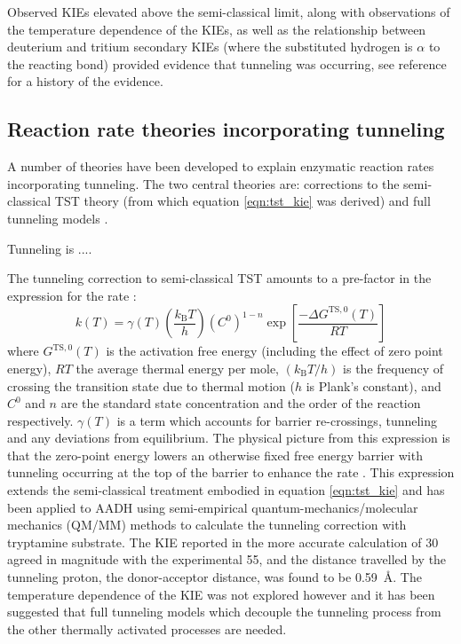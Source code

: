 Observed KIEs elevated above the semi-classical limit, along with observations of the temperature dependence of the KIEs, as well as the relationship between deuterium and tritium secondary KIEs (where the substituted hydrogen is $\alpha$ to the reacting bond) provided evidence that tunneling was occurring, see reference \cite{klinmanbeyond2009} for a history of the evidence. 

\subsection{Reaction rate theories incorporating tunneling}

A number of theories have been developed to explain enzymatic reaction rates incorporating tunneling. The two central theories are: corrections to the semi-classical TST theory (from which equation \ref{eqn:tst_kie} was derived) \cite{bellTunnelEffectChemistry1980} and full tunneling models \cite{kuznetsovProtonHydrogenAtom1999a,  antoniouLargeKineticIsotope1997, antoniouInternalEnzymeMotions2001, knappTemperatureDependentIsotopeEffects2002}. 

Tunneling is ....

The tunneling correction to semi-classical TST amounts to a pre-factor in the expression for the rate \cite{garciavilocaHowEnzymesWork2004}: 
\begin{equation}\label{eqn:tst}
k(T) =\gamma(T)\left(\frac{k_{\mathrm{B}} T}{h}\right)\left(C^{0}\right)^{1-n}\exp \left[\frac{-\Delta G^{\mathrm{TS}, 0}(T)}{R T}\right]
\end{equation}
where $G^{\mathrm{TS}, 0}(T)$ is the activation free energy (including the effect of zero point energy), $RT$ the average thermal energy per mole, $\left(k_{\mathrm{B}} T / h\right)$ is the frequency of crossing the transition state due to thermal motion ($h$ is Plank's constant), and $C^{0}$ and $n$ are the standard state concentration and the order of the reaction respectively. $\gamma(T)$ is a term which accounts for barrier re-crossings, tunneling and any deviations from equilibrium. The physical picture from this expression is that the zero-point energy lowers an otherwise fixed free energy barrier with tunneling occurring at the top of the barrier to enhance the rate \cite{garciavilocaHowEnzymesWork2004}. This expression extends the semi-classical treatment embodied in equation \ref{eqn:tst_kie} and has been applied to AADH \cite{masgrauAtomicDescriptionEnzyme2006, masgrauTunnelingClassicalPaths2007} using semi-empirical quantum-mechanics/molecular mechanics (QM/MM) methods to calculate the tunneling correction with tryptamine substrate. The KIE reported in the more accurate calculation \cite{masgrauTunnelingClassicalPaths2007} of \num{30} agreed in magnitude with the experimental \num{55}, and the distance travelled by the tunneling proton, the donor-acceptor distance, was found to be \SI{0.59}{\angstrom}. The temperature dependence of the KIE was not explored however and it has been suggested \cite{klinmanHydrogenTunnelingLinks2013, johannissenProtonTunnelingAromatic2007, klinmanbeyond2009, puMultidimensionalTunnelingRecrossing2006} that full tunneling models which decouple the tunneling process from the other thermally activated processes are needed. 


